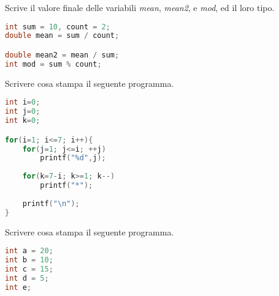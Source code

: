 \documentclass[addpoints,11pt]{exam}
\begin{document}
 \boxedpoints
\begin{center}
\end{center}

\vspace{5mm}

\noindent{}

\begin{questions}
\question[4]
Scrive il valore finale delle variabili \emph{mean}, \emph{mean2}, e \emph{mod}, ed il loro tipo.

\begin{minipage}[t]{0.4\linewidth}
\begin{lstlisting}[language=C]
int sum = 10, count = 2;
double mean = sum / count;

double mean2 = mean / sum;
int mod = sum % count;


\end{lstlisting}
\end{minipage}
\begin{minipage}[t]{0.6\linewidth}
       \makeemptybox{70pt}
\end{minipage}

\question[5]
Scrivere cosa stampa il seguente programma.

\begin{minipage}[t]{0.4\linewidth}
\begin{lstlisting}[language=C]
int i=0;
int j=0;
int k=0;

for(i=1; i<=7; i++){
    for(j=1; j<=i; ++j)
        printf("%d",j);
    
    for(k=7-i; k>=1; k--)
        printf("*");
        
    printf("\n");
}

\end{lstlisting}
\end{minipage}
\begin{minipage}[t]{0.6\linewidth}
       \makeemptybox{140pt}
\end{minipage}

\question[2]
Scrivere cosa stampa il seguente programma.

\begin{minipage}[t]{0.4\linewidth}
\begin{lstlisting}[language=C]
int a = 20;
int b = 10;
int c = 15;
int d = 5;
int e;
 

\end{lstlisting}
\end{minipage}
\end{questions}
\end{document}

